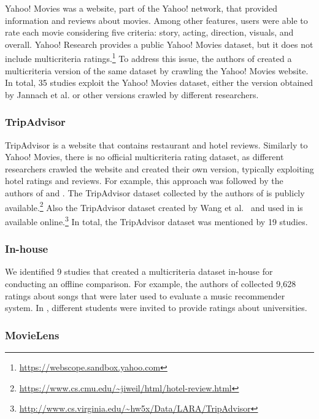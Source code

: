 Yahoo! Movies was a website, part of the Yahoo! network, that provided information and reviews about movies. Among other features, users were able to rate each movie considering five criteria: story, acting, direction, visuals, and overall. Yahoo! Research provides a public Yahoo! Movies dataset, but it does not include multicriteria ratings.\footnote{\url{https://webscope.sandbox.yahoo.com}} To address this issue, the authors of  created a multicriteria version of the same dataset by crawling the Yahoo! Movies website. In total, 35 studies exploit the Yahoo! Movies dataset, either the version obtained by Jannach et al. or other versions crawled by different researchers.

\subsubsection{TripAdvisor}

TripAdvisor is a website that contains restaurant and hotel reviews. Similarly to Yahoo! Movies, there is no official multicriteria rating dataset, as different researchers crawled the website and created their own version, typically exploiting hotel ratings and reviews. For example, this approach was followed by the authors of  and . The TripAdvisor dataset collected by the authors of  is publicly available.\footnote{\url{https://www.cs.cmu.edu/~jiweil/html/hotel-review.html}} Also the TripAdvisor dataset created by Wang et al.~\cite{Wang2010} and used in  is available online.\footnote{\url{http://www.cs.virginia.edu/~hw5x/Data/LARA/TripAdvisor}} In total, the TripAdvisor dataset was mentioned by 19 studies.

\subsubsection{In-house}

We identified 9 studies that created a multicriteria dataset in-house for conducting an offline comparison. For example, the authors of  collected 9,628 ratings about songs that were later used to evaluate a music recommender system. In , different students were invited to provide ratings about universities.

\subsubsection{MovieLens}

